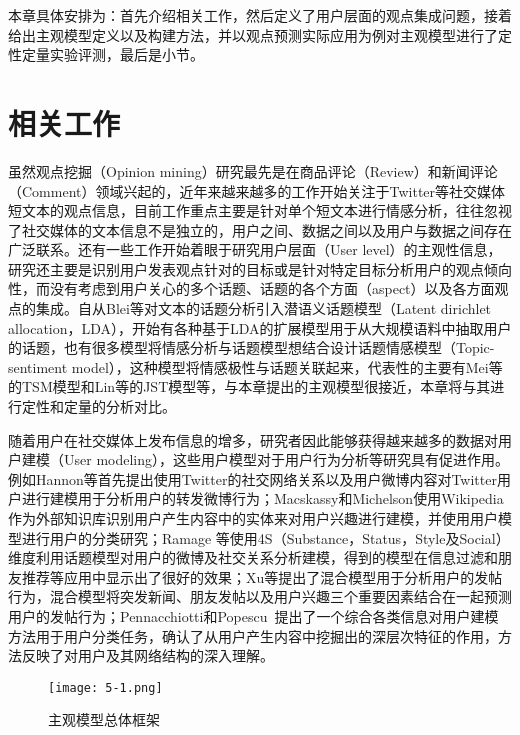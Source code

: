 本章具体安排为：首先介绍相关工作，然后定义了用户层面的观点集成问题，接着给出主观模型定义以及构建方法，并以观点预测实际应用为例对主观模型进行了定性定量实验评测，最后是小节。

\section{相关工作}
\label{ch5_sec2}
虽然观点挖掘（Opinion mining）研究最先是在商品评论（Review）和新闻评论（Comment）领域兴起的，近年来越来越多的工作开始关注于Twitter等社交媒体短文本的观点信息，目前工作重点主要是针对单个短文本进行情感分析，往往忽视了社交媒体的文本信息不是独立的，用户之间、数据之间以及用户与数据之间存在广泛联系。还有一些工作开始着眼于研究用户层面（User level）的主观性信息，研究还主要是识别用户发表观点针对的目标或是针对特定目标分析用户的观点倾向性，而没有考虑到用户关心的多个话题、话题的各个方面（aspect）以及各方面观点的集成。自从Blei等对文本的话题分析引入潜语义话题模型（Latent dirichlet allocation，LDA），开始有各种基于LDA的扩展模型用于从大规模语料中抽取用户的话题，也有很多模型将情感分析与话题模型想结合设计话题情感模型（Topic-sentiment model），这种模型将情感极性与话题关联起来，代表性的主要有Mei等的TSM模型和Lin等的JST模型等，与本章提出的主观模型很接近，本章将与其进行定性和定量的分析对比。

随着用户在社交媒体上发布信息的增多，研究者因此能够获得越来越多的数据对用户建模（User modeling），这些用户模型对于用户行为分析等研究具有促进作用。例如Hannon等首先提出使用Twitter的社交网络关系以及用户微博内容对Twitter用户进行建模用于分析用户的转发微博行为；Macskassy和Michelson使用Wikipedia作为外部知识库识别用户产生内容中的实体来对用户兴趣进行建模，并使用用户模型进行用户的分类研究；Ramage 等使用4S（Substance，Status，Style及Social）维度利用话题模型对用户的微博及社交关系分析建模，得到的模型在信息过滤和朋友推荐等应用中显示出了很好的效果；Xu等提出了混合模型用于分析用户的发帖行为，混合模型将突发新闻、朋友发帖以及用户兴趣三个重要因素结合在一起预测用户的发帖行为；Pennacchiotti和Popescu~提出了一个综合各类信息对用户建模方法用于用户分类任务，确认了从用户产生内容中挖掘出的深层次特征的作用，方法反映了对用户及其网络结构的深入理解。

\begin{landscape}
\begin{figure*}[htb]
\centering
\texttt{[image: 5-1.png]}
\caption{主观模型总体框架}
\label{fig5-1-1}
\end{figure*}
\end{landscape}

